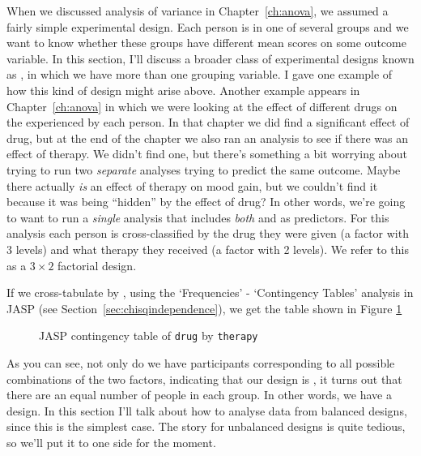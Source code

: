 When we discussed analysis of variance in Chapter~\ref{ch:anova}, we assumed a fairly simple experimental design. Each person is in one of several groups and we want to know whether these groups have different mean scores on some outcome variable. In this section, I'll discuss a broader class of experimental designs known as , in which we have more than one grouping variable. I gave one example of how this kind of design might arise above. Another example appears in  Chapter~\ref{ch:anova} in which we were looking at the effect of different drugs on the  experienced by each person. In that chapter we did find a significant effect of drug, but at the end of the chapter we also ran an analysis to see if there was an effect of therapy. We didn't find one, but there's something a bit worrying about trying to run two {\it separate} analyses trying to predict the same outcome. Maybe there actually {\it is} an effect of therapy on mood gain, but we couldn't find it because it was being ``hidden'' by the effect of drug? In other words, we're going to want to run a {\it single} analysis that includes {\it both}  and  as predictors. For this analysis each person is cross-classified by the drug they were given (a factor with 3 levels) and what therapy they received (a factor with 2 levels). We refer to this as a $3 \times 2$ factorial design. 

If we cross-tabulate  by , using the `Frequencies' - `Contingency Tables' analysis in JASP (see Section~\ref{sec:chisqindependence}), we get the table shown in Figure \ref{fig:factorialanova1}

\begin{figure}[!htb]
\begin{center}
\caption{JASP contingency table of \texttt{drug} by \texttt{therapy}}
\label{fig:factorialanova1}
\HR
\end{center}
\end{figure}

As you can see, not only do we have participants corresponding to all possible combinations of the two factors, indicating that our design is , it turns out that there are an equal number of people in each group. In other words, we have a  design. In this section I'll talk about how to analyse data from balanced designs, since this is the simplest case. The story for unbalanced designs is quite tedious, so we'll put it to one side for the moment.

